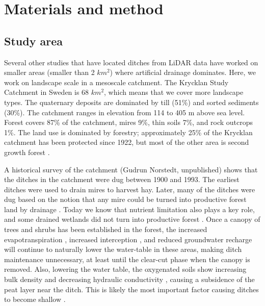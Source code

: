 \documentclass[]{interact}
\theoremstyle{plain}%
\theoremstyle{definition}
\theoremstyle{remark}
\begin{document}
\section{Materials and method}
\label{method}

\subsection{Study area}
Several other studies \citep{roelens, bailly, rapinel, kiss} that have located ditches from LiDAR data have worked on smaller areas (smaller than 2 $km^2$) where artificial drainage dominates. Here, we work on landscape scale in a mesoscale catchment. The  Krycklan Study Catchment in Sweden is 68 $km^2$, which means that we cover more landscape types. The quaternary deposits are dominated by till (51\%) and sorted sediments (30\%). The catchment ranges in elevation from 114 to 405 m above sea level. Forest covers 87\% of the catchment, mires 9\%, thin soils 7\%, and rock outcrops 1\%. The land use is dominated by forestry; approximately 25\% of the Krycklan catchment has been protected since 1922, but most of the other area is second growth forest \citep{krycklancatchment}. 

A historical survey of the catchment (Gudrun Norstedt, unpublished) shows that the ditches in the catchment were dug between 1900 and 1993. The earliest ditches were used to drain mires to harvest hay. Later, many of the ditches were dug based on the notion that any mire could be turned into productive forest land by drainage \citep{paivanen}. Today we know that nutrient limitation also plays a key role, and some drained wetlands did not turn into productive forest \citep{sikstrom}. Once a canopy of trees and shrubs has been established in the forest, the increased evapotranspiration \citep{price, koivusalo}, increased interception \citep{price}, and reduced groundwater recharge will continue to naturally lower the water-table in these areas, making ditch maintenance unnecessary, at least until the clear-cut phase when the canopy is removed. Also,  lowering the water table, the oxygenated soils show increasing bulk density and decreasing hydraulic conductivity \citep{silins, price}, causing a subsidence of the peat layer near the ditch. This is likely the most important factor causing ditches to become shallow \citep{heikurainen}.
\end{document}

